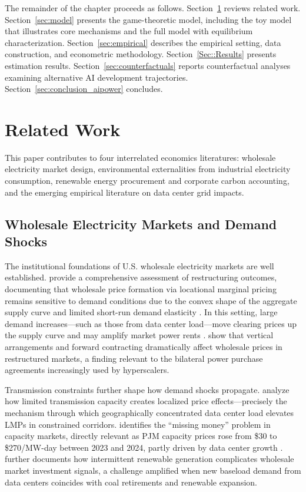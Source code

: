 \documentclass[a4paper,fleqn,longmktitle]{cas-sc}
\begin{document}
The remainder of the chapter proceeds as follows. Section~\ref{sec:relatedwork} reviews related work. Section~\ref{sec:model} presents the game-theoretic model, including the toy model that illustrates core mechanisms and the full model with equilibrium characterization. Section~\ref{sec:empirical} describes the empirical setting, data construction, and econometric methodology. Section~\ref{Sec::Results} presents estimation results. Section~\ref{sec:counterfactuals} reports counterfactual analyses examining alternative AI development trajectories. Section~\ref{sec:conclusion_aipower} concludes.

\section{Related Work}\label{sec:relatedwork}

This paper contributes to four interrelated economics literatures: wholesale electricity market design, environmental externalities from industrial electricity consumption, renewable energy procurement and corporate carbon accounting, and the emerging empirical literature on data center grid impacts.
 
\subsection{Wholesale Electricity Markets and Demand Shocks}
 
The institutional foundations of U.S. wholesale electricity markets are well established. \citet{borenstein_bushnell2015} provide a comprehensive assessment of restructuring outcomes, documenting that wholesale price formation via locational marginal pricing remains sensitive to demand conditions due to the convex shape of the aggregate supply curve and limited short-run demand elasticity \citep{borenstein2002trouble}. In this setting, large demand increases---such as those from data center load---move clearing prices up the supply curve and may amplify market power rents \citep{borenstein2002measuring, borenstein_bushnell1999}. \citet{bushnell_mansur_saravia2008} show that vertical arrangements and forward contracting dramatically affect wholesale prices in restructured markets, a finding relevant to the bilateral power purchase agreements increasingly used by hyperscalers.
 
Transmission constraints further shape how demand shocks propagate. \citet{borenstein_bushnell_stoft2000} analyze how limited transmission capacity creates localized price effects---precisely the mechanism through which geographically concentrated data center load elevates LMPs in constrained corridors. \citet{joskow2008capacity} identifies the ``missing money'' problem in capacity markets, directly relevant as PJM capacity prices rose from \$30 to \$270/MW-day between 2023 and 2024, partly driven by data center growth \citep{cmu2025}. \citet{joskow2019} further documents how intermittent renewable generation complicates wholesale market investment signals, a challenge amplified when new baseload demand from data centers coincides with coal retirements and renewable expansion.
 
\end{document}
